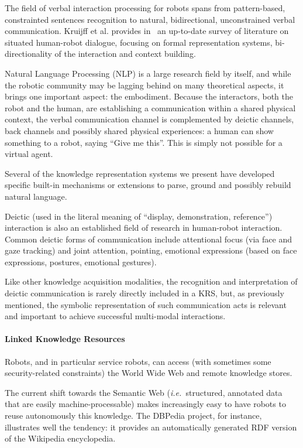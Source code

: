 \documentclass[a4paper, twocolumn]{article}
\newcommand{\ie}{{\textit{i.e.\ }}}
\begin{document}
The field of verbal interaction processing for robots spans from pattern-based,
constrainted sentences recognition to natural, bidirectional, unconstrained
verbal communication. Kruijff et al. provides in~\cite{Kruijff2010} an
up-to-date survey of literature on situated human-robot dialogue, focusing on
formal representation systems, bi-directionality of the interaction and context
building.

Natural Language Processing (NLP) is a large research field by itself, and
while the robotic community may be lagging behind on many theoretical aspects,
it brings one important aspect: the embodiment. Because the interactors, both
the robot and the human, are establishing a communication within a shared
physical context, the verbal communication channel is complemented by deictic
channels, back channels and possibly shared physical experiences: a human can
show something to a robot, saying ``Give me this''. This is simply not possible
for a virtual agent.

Several of the knowledge representation systems we present have developed
specific built-in mechanisms or extensions to parse, ground and possibly
rebuild natural language.

Deictic (used in the literal meaning of ``display, demonstration, reference'')
interaction is also an established field of research in human-robot
interaction. Common deictic forms of communication include attentional focus
(via face and gaze tracking) and joint attention, pointing, emotional
expressions (based on face expressions, postures, emotional gestures).

Like other knowledge acquisition modalities, the recognition and interpretation
of deictic communication is rarely directly included in a KRS, but, as
previously mentioned, the symbolic representation of such communication acts is
relevant and important to achieve successful multi-modal interactions.

\paragraph{Linked Knowledge Resources}
\label{sect|lod}

Robots, and in particular service robots, can access (with sometimes some
security-related constraints) the World Wide Web and remote knowledge stores.

The current shift towards the Semantic Web (\ie structured, annotated data that
are easily machine-processable) makes increasingly easy to have robots to reuse
autonomously this knowledge. The DBPedia project, for instance, illustrates
well the tendency: it provides an automatically generated RDF version of the
Wikipedia encyclopedia.
\end{document}
